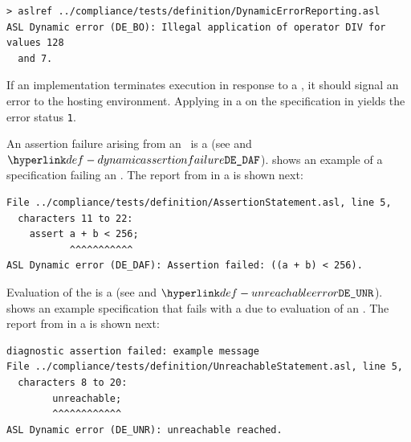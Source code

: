 
\begin{Verbatim}[fontsize=\footnotesize, frame=single]
> aslref ../compliance/tests/definition/DynamicErrorReporting.asl
ASL Dynamic error (DE_BO): Illegal application of operator DIV for values 128
  and 7.
\end{Verbatim}

If an implementation terminates execution in response to a \dynamicerrorterm{},
it should signal an error to the hosting environment.
%
Applying \aslrefterm{} in a \linuxbashshellterm{} on the specification in 
yields the error status \texttt{1}.

An assertion failure arising from an \assertionstatementterm\ is a \dynamicerrorterm{}
(see  and \errorcodeterm{} $\DynamicAssertionFailure$).
%
 shows an example of a specification failing
an \assertionstatementterm{}.
The report from \aslrefterm{} in a \linuxbashshellterm{} is shown next:
\begin{Verbatim}[fontsize=\footnotesize, frame=single]
File ../compliance/tests/definition/AssertionStatement.asl, line 5,
  characters 11 to 22:
    assert a + b < 256;
           ^^^^^^^^^^^
ASL Dynamic error (DE_DAF): Assertion failed: ((a + b) < 256).
\end{Verbatim}

Evaluation of the \unreachablestatementterm{} is a \dynamicerrorterm{}
(see \SemanticsRuleRef{SUnreachable} and \errorcodeterm{} $\UnreachableError$).
%
 shows an example specification that
fails with a \dynamicerrorsterm{} due to evaluation of an \unreachablestatementterm{}.
The report from \aslrefterm{} in a \linuxbashshellterm{} is shown next:

\begin{Verbatim}[fontsize=\footnotesize, frame=single]
diagnostic assertion failed: example message
File ../compliance/tests/definition/UnreachableStatement.asl, line 5,
  characters 8 to 20:
        unreachable;
        ^^^^^^^^^^^^
ASL Dynamic error (DE_UNR): unreachable reached.
\end{Verbatim}

